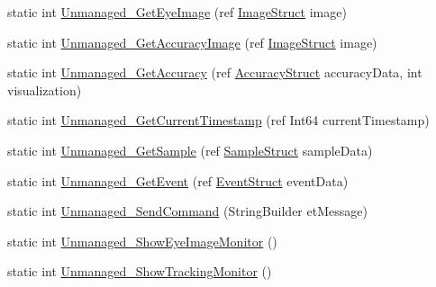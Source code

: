 \begin{DoxyCompactItemize}
\item 
static int \hyperlink{class_web_analyzer_1_1_eye_tracking_1_1_eye_tracking_controller_ad4c5121e41718af2967731231f763b14}{Unmanaged\+\_\+\+Get\+Eye\+Image} (ref \hyperlink{struct_web_analyzer_1_1_eye_tracking_1_1_eye_tracking_controller_1_1_image_struct}{Image\+Struct} image)
\item 
static int \hyperlink{class_web_analyzer_1_1_eye_tracking_1_1_eye_tracking_controller_ae1a8ed0bd4339bef367289bccd67306c}{Unmanaged\+\_\+\+Get\+Accuracy\+Image} (ref \hyperlink{struct_web_analyzer_1_1_eye_tracking_1_1_eye_tracking_controller_1_1_image_struct}{Image\+Struct} image)
\item 
static int \hyperlink{class_web_analyzer_1_1_eye_tracking_1_1_eye_tracking_controller_a699265d5143beda24917af96137c33c1}{Unmanaged\+\_\+\+Get\+Accuracy} (ref \hyperlink{struct_web_analyzer_1_1_eye_tracking_1_1_eye_tracking_controller_1_1_accuracy_struct}{Accuracy\+Struct} accuracy\+Data, int visualization)
\item 
static int \hyperlink{class_web_analyzer_1_1_eye_tracking_1_1_eye_tracking_controller_ae5d5631a24103fb584822943961a25f4}{Unmanaged\+\_\+\+Get\+Current\+Timestamp} (ref Int64 current\+Timestamp)
\item 
static int \hyperlink{class_web_analyzer_1_1_eye_tracking_1_1_eye_tracking_controller_ac52c00687f811915fdc7c70c72849f08}{Unmanaged\+\_\+\+Get\+Sample} (ref \hyperlink{struct_web_analyzer_1_1_eye_tracking_1_1_eye_tracking_controller_1_1_sample_struct}{Sample\+Struct} sample\+Data)
\item 
static int \hyperlink{class_web_analyzer_1_1_eye_tracking_1_1_eye_tracking_controller_ae58916f14903bc12ecf069bc0f453a55}{Unmanaged\+\_\+\+Get\+Event} (ref \hyperlink{struct_web_analyzer_1_1_eye_tracking_1_1_eye_tracking_controller_1_1_event_struct}{Event\+Struct} event\+Data)
\item 
static int \hyperlink{class_web_analyzer_1_1_eye_tracking_1_1_eye_tracking_controller_a9ba64cfae2b8e77504efb10a421cc583}{Unmanaged\+\_\+\+Send\+Command} (String\+Builder et\+Message)
\item 
static int \hyperlink{class_web_analyzer_1_1_eye_tracking_1_1_eye_tracking_controller_af1d27214e9a1c10d85e5de2d3fe6de20}{Unmanaged\+\_\+\+Show\+Eye\+Image\+Monitor} ()
\item 
static int \hyperlink{class_web_analyzer_1_1_eye_tracking_1_1_eye_tracking_controller_a9ee835599abfd4570b0d715e8e9dabd5}{Unmanaged\+\_\+\+Show\+Tracking\+Monitor} ()
\item 

\end{DoxyCompactItemize}
